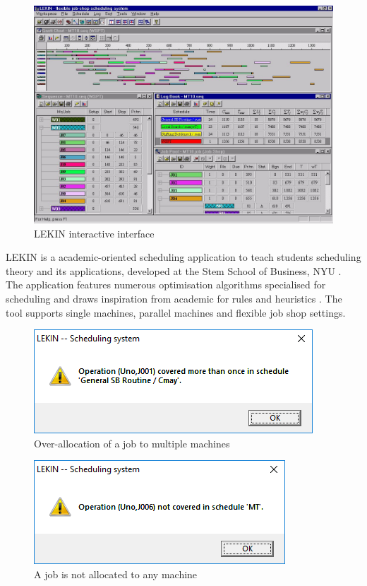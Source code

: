 \begin{figure}[H]
	\begin{center}
		\includegraphics[width=\linewidth]{figures/lekin_gui.jpg}
	\end{center}
	\caption{LEKIN interactive interface \cite{lekin}}
\end{figure}

LEKIN is a academic-oriented scheduling application to teach students scheduling theory and its applications, developed at the Stem School of Business, NYU \cite{lekin}. The application features numerous optimisation algorithms specialised for scheduling and draws inspiration from academic for rules and heuristics \cite{sta}. The tool supports single machines, parallel machines and flexible job shop settings.

\begin{figure}[H]
	\begin{center}
		\includegraphics[scale=0.8]{figures/lekin_overallocated.png}
	\end{center}
	\caption{Over-allocation of a job to multiple machines}
\end{figure}

\begin{figure}[H]
	\begin{center}
		\includegraphics[scale=0.8]{figures/lekin_unallocated.png}
	\end{center}
	\caption{A job is not allocated to any machine}
\end{figure}

